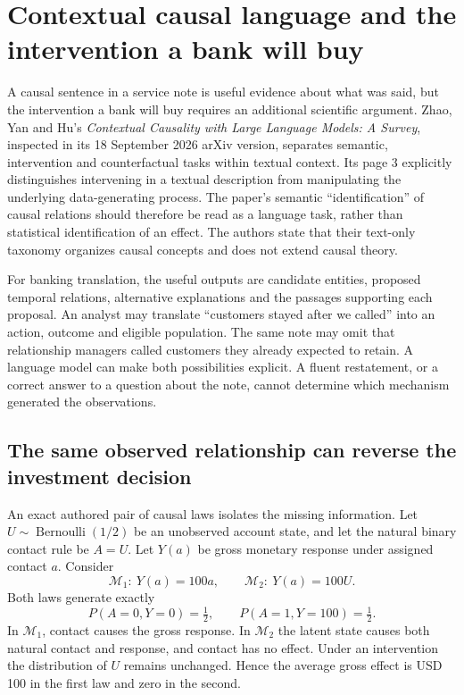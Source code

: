 \section{Contextual causal language and the intervention a bank will buy}
\label{exec23:context-scope}

A causal sentence in a service note is useful evidence about what was said,
but the intervention a bank will buy requires an additional scientific
argument. Zhao, Yan and Hu's \emph{Contextual Causality with Large Language
Models: A Survey}, inspected in its 18 September 2026 arXiv version, separates
semantic, intervention and counterfactual tasks within textual context. Its
page 3 explicitly distinguishes intervening in a textual description from
manipulating the underlying data-generating process. The paper's semantic
``identification'' of causal relations should therefore be read as a language
task, rather than statistical identification of an effect. The authors state
that their text-only taxonomy organizes causal concepts and does not extend
causal theory.\citep{exec23_contextual_causality_survey}

For banking translation, the useful outputs are candidate entities, proposed
temporal relations, alternative explanations and the passages supporting each
proposal. An analyst may translate ``customers stayed after we called'' into
an action, outcome and eligible population. The same note may omit that
relationship managers called customers they already expected to retain. A
language model can make both possibilities explicit. A fluent restatement,
or a correct answer to a question about the note, cannot determine which
mechanism generated the observations.

\subsection{The same observed relationship can reverse the investment decision}
\label{exec23:context-twins}

An exact authored pair of causal laws isolates the missing information. Let
$U\sim\operatorname{Bernoulli}(1/2)$ be an unobserved account state, and let the
natural binary contact rule be $A=U$. Let $Y(a)$ be gross monetary response
under assigned contact $a$. Consider
\begin{equation}
 \mathcal M_1:\ Y(a)=100a,
 \qquad
 \mathcal M_2:\ Y(a)=100U.
 \label{exec23:context-laws}
\end{equation}
Both laws generate exactly
\begin{equation}
 P(A=0,Y=0)=\tfrac12,
 \qquad P(A=1,Y=100)=\tfrac12.
 \label{exec23:context-observed}
\end{equation}
In $\mathcal M_1$, contact causes the gross response. In $\mathcal M_2$ the
latent state causes both natural contact and response, and contact has no
effect. Under an intervention the distribution of $U$ remains unchanged.
Hence the average gross effect is USD 100 in the first law and zero in the
second.\citep{exec23_context_reference}

